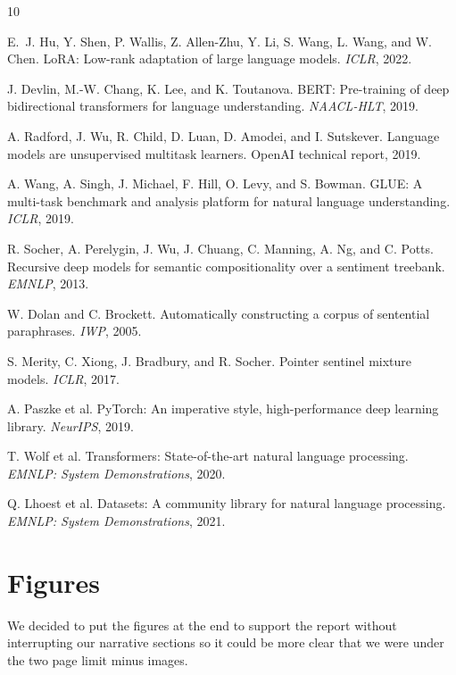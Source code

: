 \documentclass[11pt,twocolumn]{article}
\begin{document}
{
\begin{thebibliography}{10}
\setlength{\itemsep}{-1pt}
\setlength{\parskip}{0pt}

E.~J. Hu, Y. Shen, P. Wallis, Z. Allen-Zhu, Y. Li, S. Wang, L. Wang, and W. Chen. LoRA: Low-rank adaptation of large language models. \emph{ICLR}, 2022.

J. Devlin, M.-W. Chang, K. Lee, and K. Toutanova. BERT: Pre-training of deep bidirectional transformers for language understanding. \emph{NAACL-HLT}, 2019.

A. Radford, J. Wu, R. Child, D. Luan, D. Amodei, and I. Sutskever. Language models are unsupervised multitask learners. OpenAI technical report, 2019.

A. Wang, A. Singh, J. Michael, F. Hill, O. Levy, and S. Bowman. GLUE: A multi-task benchmark and analysis platform for natural language understanding. \emph{ICLR}, 2019.

R. Socher, A. Perelygin, J. Wu, J. Chuang, C. Manning, A. Ng, and C. Potts. Recursive deep models for semantic compositionality over a sentiment treebank. \emph{EMNLP}, 2013.

W. Dolan and C. Brockett. Automatically constructing a corpus of sentential paraphrases. \emph{IWP}, 2005.

S. Merity, C. Xiong, J. Bradbury, and R. Socher. Pointer sentinel mixture models. \emph{ICLR}, 2017.

A. Paszke et al. PyTorch: An imperative style, high-performance deep learning library. \emph{NeurIPS}, 2019.

T. Wolf et al. Transformers: State-of-the-art natural language processing. \emph{EMNLP: System Demonstrations}, 2020.

Q. Lhoest et al. Datasets: A community library for natural language processing. \emph{EMNLP: System Demonstrations}, 2021.

\end{thebibliography}
}

\clearpage
\onecolumn
\section*{Figures}
We decided to put the figures at the end to support the report without interrupting our narrative sections so it could be more clear that we were under the two page limit minus images.
\end{document}
